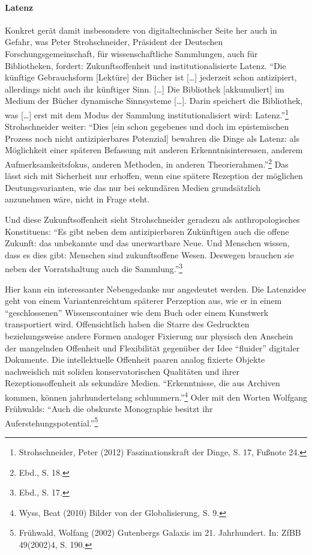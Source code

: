 \documentclass[a4paper,
fontsize=11pt,
oneside,
numbers=noperiodatend,
parskip=half-,
bibliography=totoc,
final
]{scrartcl}
\begin{document}
\paragraph{Latenz}\label{latenz}

Konkret gerät damit insbesondere von digitaltechnischer Seite her auch
in Gefahr, was Peter Strohschneider, Präsident der Deutschen
Forschungsgemeinschaft, für wissenschaftliche Sammlungen, auch für
Bibliotheken, fordert: Zukunftsoffenheit und institutionalisierte
Latenz. \enquote{Die künftige Gebrauchsform {[}Lektüre{]} der Bücher ist
{[}\ldots{}{]} jederzeit schon antizipiert, allerdings nicht auch ihr
künftiger Sinn. {[}\ldots{}{]} Die Bibliothek {[}akkumuliert{]} im
Medium der Bücher dynamische Sinnsysteme {[}\ldots{}{]}. Darin speichert
die Bibliothek, was {[}\ldots{}{]} erst mit dem Modus der Sammlung
institutionalisiert wird: Latenz.}\footnote{Strohschneider, Peter (2012)
  Faszinationskraft der Dinge, S. 17, Fußnote 24.} Strohschneider
weiter: \enquote{Dies {[}ein schon gegebenes und doch im epistemischen
Prozess noch nicht antizipierbares Potenzial{]} bewahren die Dinge als
Latenz: als Möglichkeit einer späteren Befassung mit anderen
Erkenntnisinteressen, anderem Aufmerksamkeitsfokus, anderen Methoden, in
anderen Theorierahmen.}\footnote{Ebd., S. 18.} Das lässt sich mit
Sicherheit nur erhoffen, wenn eine spätere Rezeption der möglichen
Deutungsvarianten, wie das nur bei sekundären Medien grundsätzlich
anzunehmen wäre, nicht in Frage steht.

Und diese Zukunftsoffenheit sieht Strohschneider geradezu als
anthropologisches Konstituens: \enquote{Es gibt neben dem
antizipierbaren Zukünftigen auch die offene Zukunft: das unbekannte und
das unerwartbare Neue. Und Menschen wissen, dass es dies gibt: Menschen
sind zukunftsoffene Wesen. Deswegen brauchen sie neben der
Vorratshaltung auch die Sammlung.}\footnote{Ebd., S. 17.}

Hier kann ein interessanter Nebengedanke nur angedeutet werden. Die
Latenzidee geht von einem Variantenreichtum späterer Perzeption aus, wie
er in einem \enquote{geschlossenen} Wissenscontainer wie dem Buch oder
einem Kunstwerk transportiert wird. Offensichtlich haben die Starre des
Gedruckten beziehungsweise andere Formen analoger Fixierung nur physisch
den Anschein der mangelnden Offenheit und Flexibilität gegenüber der
Idee \enquote{fluider} digitaler Dokumente. Die intellektuelle Offenheit
paaren analog fixierte Objekte nachweislich mit soliden
konservatorischen Qualitäten und ihrer Rezeptionsoffenheit als sekundäre
Medien. \enquote{Erkenntnisse, die aus Archiven kommen, können
jahrhundertelang schlummern.}\footnote{Wyss, Beat (2010) Bilder von der
  Globalisierung, S. 9.} Oder mit den Worten Wolfgang Frühwalds:
\enquote{Auch die obskurste Monographie besitzt ihr
Auferstehungspotential.}\footnote{Frühwald, Wolfang (2002) Gutenbergs
  Galaxis im 21. Jahrhundert. In: ZfBB 49(2002)4, S. 190.}
\end{document}
